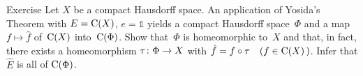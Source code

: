 \documentclass[main.tex]{subfiles}
\begin{document}
%
%
\begin{psec}{3.15}{Exercise}
Let $X$ be a compact Hausdorff space.
An application of Yosida's Theorem with $E=\mathrm{C}(X)$,
$e=\mathbb{1}$ yields
a compact Hausdorff space~$\Phi$
and a map $f\mapsto\hat{f}$ of~$\mathrm{C}(X)$ into~$\mathrm{C}(\Phi)$.
Show that~$\Phi$ is homeomorphic to~$X$
and that, in fact, there exists a homeomorphism
$\tau\colon \Phi\rightarrow X$ with $\hat{f}=f\circ \tau\quad(f\in \mathrm{C}(X)\, )$.
Infer that $\hat{E}$ is all of $\mathrm{C}(\Phi)$.
\end{psec}
\clearpage
\end{document}
